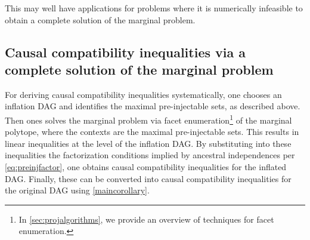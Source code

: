 \documentclass[aps,english,superscriptaddress,onecolumn,twoside,longbibliography,pra,floatfix,fleqn,nofootinbib]{revtex4-1}%
\theoremstyle{definition}
\begin{document}
This may well have applications for problems where it is numerically infeasible to obtain a complete solution of the marginal problem. 
 \color{black} 


\subsection{Causal compatibility inequalities via a complete solution of the marginal problem}\label{sec:CCineqs}

For deriving causal compatibility inequalities systematically, one chooses an inflation DAG and identifies the maximal pre-injectable sets, as described above. Then ones solves the marginal problem via facet enumeration\footnote{In \cref{sec:projalgorithms}, we provide an overview of techniques for facet enumeration.} of the marginal polytope, where the contexts are the maximal pre-injectable sets. This results in linear inequalities at the level of the inflation DAG.
By substituting into these inequalities the factorization conditions implied by ancestral independences per \cref{eq:preinjfactor}, one obtains causal compatibility inequalities for the inflated DAG.  Finally, these can be converted into causal compatibility inequalities for the original DAG using \cref{maincorollary}.

\end{document}
